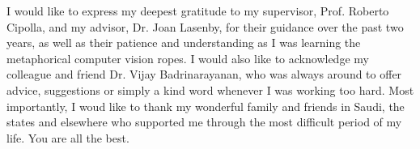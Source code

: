
\begin{acknowledgements}      


I would like to express my deepest gratitude to my supervisor, Prof. Roberto Cipolla, and my advisor, Dr. Joan Lasenby, for their guidance over the past two years, as well as their patience and understanding as I was learning the metaphorical computer vision ropes.
I would also like to acknowledge my colleague and friend Dr. Vijay Badrinarayanan, who was always around to offer advice, suggestions or simply a kind word whenever I was working too hard.
Most importantly, I woud like to thank my wonderful family and friends in Saudi, the states and elsewhere who supported me through the most difficult period of my life. You are all the best.



\end{acknowledgements}
